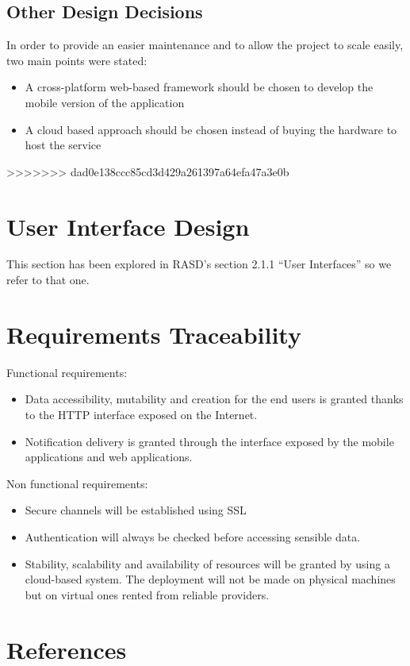 \documentclass{article}
\begin{document}
\subsection{Other Design Decisions}
In order to provide an easier maintenance and to allow the project to scale easily, two main points were stated: 
\begin{itemize}
	\item A cross-platform web-based framework should be chosen to develop the mobile version of the application 
	\item A cloud based approach should be chosen instead of buying the hardware to host the service
\end{itemize}
>>>>>>> dad0e138ccc85cd3d429a261397a64efa47a3e0b

	\section{User Interface Design}
	This section has been explored in RASD's section 2.1.1 ``User Interfaces'' so we refer to that one.

	\section{Requirements Traceability}
	Functional requirements:
	\begin{itemize}
		\item Data accessibility, mutability and creation for the end users is granted thanks to the HTTP interface exposed on the Internet.
		\item Notification delivery is granted through the interface exposed by the mobile applications and web applications.
	\end{itemize}
	Non functional requirements:
	\begin{itemize}
		\item Secure channels will be established using SSL 
		\item Authentication will always be checked before accessing sensible data.
		\item Stability, scalability and availability of resources will be granted by using a cloud-based system. The deployment will not be made on physical machines but on virtual ones rented from reliable providers.
	\end{itemize}
	\section{References}
	\clearpage
\end{document}
